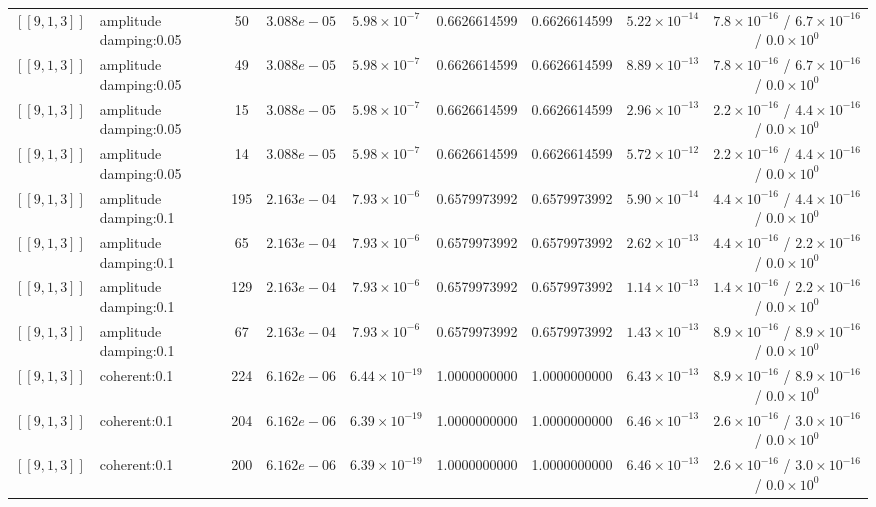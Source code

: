 \documentclass[10pt,a4paper]{article}
\begin{document}
\begin{longtable}{llccccccc}
$[\![9,1,3]\!]$ & amplitude damping:0.05 & 50 & $3.088e-05$ & $5.98\times 10^{-7}$ & 0.6626614599 & 0.6626614599 & $5.22\times 10^{-14}$ & $7.8\times 10^{-16}$ / $6.7\times 10^{-16}$ / $0.0\times 10^{0}$ \\
$[\![9,1,3]\!]$ & amplitude damping:0.05 & 49 & $3.088e-05$ & $5.98\times 10^{-7}$ & 0.6626614599 & 0.6626614599 & $8.89\times 10^{-13}$ & $7.8\times 10^{-16}$ / $6.7\times 10^{-16}$ / $0.0\times 10^{0}$ \\
$[\![9,1,3]\!]$ & amplitude damping:0.05 & 15 & $3.088e-05$ & $5.98\times 10^{-7}$ & 0.6626614599 & 0.6626614599 & $2.96\times 10^{-13}$ & $2.2\times 10^{-16}$ / $4.4\times 10^{-16}$ / $0.0\times 10^{0}$ \\
$[\![9,1,3]\!]$ & amplitude damping:0.05 & 14 & $3.088e-05$ & $5.98\times 10^{-7}$ & 0.6626614599 & 0.6626614599 & $5.72\times 10^{-12}$ & $2.2\times 10^{-16}$ / $4.4\times 10^{-16}$ / $0.0\times 10^{0}$ \\
$[\![9,1,3]\!]$ & amplitude damping:0.1 & 195 & $2.163e-04$ & $7.93\times 10^{-6}$ & 0.6579973992 & 0.6579973992 & $5.90\times 10^{-14}$ & $4.4\times 10^{-16}$ / $4.4\times 10^{-16}$ / $0.0\times 10^{0}$ \\
$[\![9,1,3]\!]$ & amplitude damping:0.1 & 65 & $2.163e-04$ & $7.93\times 10^{-6}$ & 0.6579973992 & 0.6579973992 & $2.62\times 10^{-13}$ & $4.4\times 10^{-16}$ / $2.2\times 10^{-16}$ / $0.0\times 10^{0}$ \\
$[\![9,1,3]\!]$ & amplitude damping:0.1 & 129 & $2.163e-04$ & $7.93\times 10^{-6}$ & 0.6579973992 & 0.6579973992 & $1.14\times 10^{-13}$ & $1.4\times 10^{-16}$ / $2.2\times 10^{-16}$ / $0.0\times 10^{0}$ \\
$[\![9,1,3]\!]$ & amplitude damping:0.1 & 67 & $2.163e-04$ & $7.93\times 10^{-6}$ & 0.6579973992 & 0.6579973992 & $1.43\times 10^{-13}$ & $8.9\times 10^{-16}$ / $8.9\times 10^{-16}$ / $0.0\times 10^{0}$ \\
$[\![9,1,3]\!]$ & coherent:0.1 & 224 & $6.162e-06$ & $6.44\times 10^{-19}$ & 1.0000000000 & 1.0000000000 & $6.43\times 10^{-13}$ & $8.9\times 10^{-16}$ / $8.9\times 10^{-16}$ / $0.0\times 10^{0}$ \\
$[\![9,1,3]\!]$ & coherent:0.1 & 204 & $6.162e-06$ & $6.39\times 10^{-19}$ & 1.0000000000 & 1.0000000000 & $6.46\times 10^{-13}$ & $2.6\times 10^{-16}$ / $3.0\times 10^{-16}$ / $0.0\times 10^{0}$ \\
$[\![9,1,3]\!]$ & coherent:0.1 & 200 & $6.162e-06$ & $6.39\times 10^{-19}$ & 1.0000000000 & 1.0000000000 & $6.46\times 10^{-13}$ & $2.6\times 10^{-16}$ / $3.0\times 10^{-16}$ / $0.0\times 10^{0}$ \\

\end{longtable}
\end{document}

